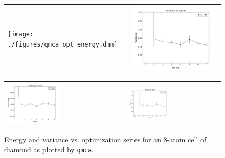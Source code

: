 \begin{figure}
  \centering
  \ifdefined\HCode%
  \begin{tabularx}{1024pt}{X X}
    \texttt{[image: ./figures/qmca\_opt\_energy.dmn]}&
    \includegraphics[trim=2mm 0mm 4mm 0mm,clip,width=512pt]{./figures/qmca_opt_variance.png}\\
  \end{tabularx}
\else%
  \begin{tabularx}{\textwidth}{X X}
    \includegraphics[trim=0mm 0mm 4mm 0mm,clip,width=0.47\textwidth]{./figures/qmca_opt_energy.pdf}&
    \includegraphics[trim=2mm 0mm 4mm 0mm,clip,width=0.47\textwidth]{./figures/qmca_opt_variance.png}\\
    \end{tabularx}
\fi%
  \caption{Energy and variance vs. optimization series for an 8-atom cell of diamond as plotted by \texttt{qmca}.}%
  \label{fig:qmca_opt_ev}%
\end{figure}

